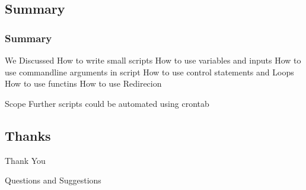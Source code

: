 \documentclass{beamer}
\begin{document}
\subsection{ Summary }
\begin{frame}\frametitle{ Summary}

\begin{block}{ We Discussed }
How to write small scripts \newline
How to use variables and inputs \newline
How to use commandline arguments in script \newline
How to use control statements and Loops \newline
How to use functins \newline
How to use Redirecion
\end{block}
\pause
\begin{block}{ Scope }
Further scripts could be automated using crontab
\end{block}

\end{frame}


\subsection{ Thanks }

\begin{frame}

\begin{block}{       Thank You  }
\end{block}
\begin{block}{    Questions and Suggestions }
\end{block}


\end{frame}
\end{document}
